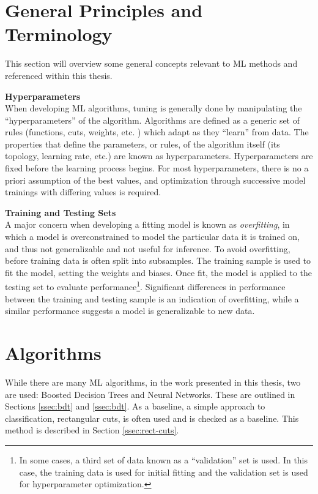 \section{General Principles and Terminology}

This section will overview some general concepts relevant to \gls{ML} methods and referenced within this thesis.

\noindent\textbf{Hyperparameters}\\
\indent When developing \gls{ML} algorithms, tuning is generally done by manipulating the ``hyperparameters'' of the algorithm. Algorithms are defined as a generic set of rules (functions, cuts, weights, etc. ) which adapt as they ``learn'' from data. The properties that define the parameters, or rules, of the algorithm itself (its topology, learning rate, etc.) are known as hyperparameters. Hyperparameters are fixed before the learning process begins. For most hyperparameters, there is no a priori assumption of the best values, and optimization through successive model trainings with differing values is required.

\noindent\textbf{Training and Testing Sets}\\
\indent A major concern when developing a fitting model is known as \textit{overfitting}, in which a model is overconstrained to model the particular data it is trained on, and thus not generalizable and not useful for inference. To avoid overfitting, before training data is often split into subsamples. The training sample is used to fit the model, setting the weights and biases. Once fit, the model is applied to the testing set to evaluate performance\footnote{In some cases, a third set of data known as a ``validation'' set is used. In this case, the training data is used for initial fitting and the validation set is used for hyperparameter optimization.}. Significant differences in performance between the training and testing sample is an indication of overfitting, while a similar performance suggests a model is generalizable to new data.


\section{Algorithms}

While there are many \gls{ML} algorithms, in the work presented in this thesis, two are used: Boosted Decision Trees and Neural Networks. These are outlined in Sections \ref{ssec:bdt} and \ref{ssec:bdt}. As a baseline, a simple approach to classification, rectangular cuts, is often used and is checked as a baseline. This method is described in Section \ref{ssec:rect-cuts}.


